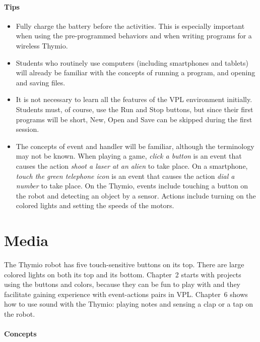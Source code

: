 \documentclass[11pt,a4paper,english]{article}
\begin{document}
\paragraph{Tips}

\begin{itemize}
\item Fully charge the battery before the activities. This is
especially important when using the pre-programmed behaviors and
when writing programs for a wireless Thymio.

\item Students who routinely use computers (including smartphones and
tablets) will already be familiar with the concepts of running a
program, and opening and saving files.

\item It is not necessary to learn all the features of the VPL
environment initially. Students must, of course, use the Run and Stop
buttons, but since their first programs will be short, New, Open and
Save can be skipped during the first session.

\item The concepts of event and handler will be familiar, although the
terminology may not be known. When playing a game, \emph{click a button}
is an event that causes the action \emph{shoot a laser at an alien} to
take place. On a smartphone, \emph{touch the green telephone icon} is an
event that causes the action \emph{dial a number} to take place. On the
Thymio, events include touching a button on the robot and detecting an
object by a sensor. Actions include turning on the colored lights
and setting the speeds of the motors.

\end{itemize}


\section{Media}

The Thymio robot has five touch-sensitive buttons on its top. There are
large colored lights on both its top and its bottom. Chapter~2 starts
with projects using the buttons and colors, because they can be fun to
play with and they facilitate gaining experience with event-actions
pairs in VPL. Chapter~6 shows how to use sound with the Thymio: playing
notes and sensing a clap or a tap on the robot.

\paragraph{Concepts}
\end{document}
